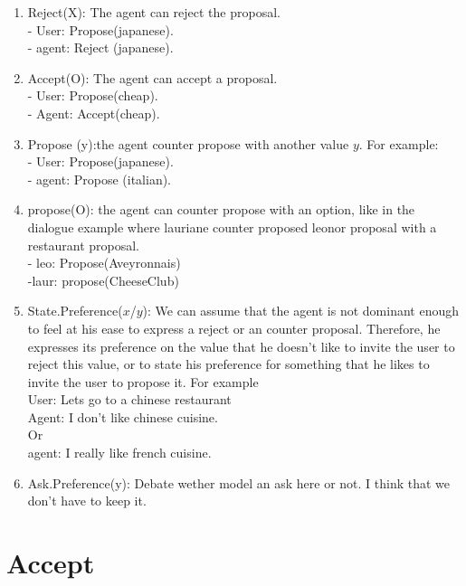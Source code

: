\documentclass{llncs}
\begin{document}
\begin{enumerate}
\item Reject(X): The agent can reject the proposal.
\\ - User: Propose(japanese).
\\ - agent: Reject (japanese). 
\item Accept(O): The agent can accept a proposal.
\\ - User: Propose(cheap).
\\ - Agent: Accept(cheap). 

\item Propose (y):the agent  counter propose with another value $y$. 
For example:
\\ - User: Propose(japanese).
\\ - agent: Propose (italian). 

\item propose(O): the agent can counter propose with an option, like in the dialogue example where lauriane counter proposed leonor proposal with a restaurant proposal. 
\\ - leo: Propose(Aveyronnais)
\\ -laur: propose(CheeseClub)


\item State.Preference($x$/$y$): We can assume that the agent is not dominant enough to feel at his  ease to express a reject or an counter proposal. Therefore, he expresses its preference on the value that he doesn't like to invite the user to reject this value, or to state his preference for something that he likes to invite the user to propose it. For example
\\ User: Lets go to a chinese restaurant
\\ Agent: I don't like chinese cuisine.
\\ Or
\\ agent: I really like french cuisine. 

\item Ask.Preference(y):  Debate wether model an ask here or not. I think that we don't have to keep it.
\end{enumerate}


\section{Accept}
\end{document}

